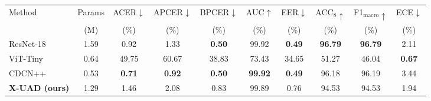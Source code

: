 \begin{tabular}{lccccccccc}
\toprule
Method & Params & ACER$\downarrow$ & APCER$\downarrow$ & BPCER$\downarrow$ & AUC$\uparrow$ & EER$\downarrow$ & ACC$_8\uparrow$ & F1$_{\text{macro}}\uparrow$ & ECE$\downarrow$ \\
 & (M) & (\%) & (\%) & (\%) & (\%) & (\%) & (\%) & (\%) & (\%) \\
\midrule
ResNet-18~\cite{he2016resnet} & 1.59 & 0.92 & 1.33 & \textbf{0.50} & 99.92 & \textbf{0.49} & \textbf{96.79} & \textbf{96.79} & 2.11 \\
ViT-Tiny~\cite{dosovitskiy2021vit} & 0.64 & 49.75 & 60.67 & 38.83 & 73.43 & 34.65 & 51.27 & 46.04 & \textbf{0.67} \\
CDCN++~\cite{yu2020cdcn} & 0.53 & \textbf{0.71} & \textbf{0.92} & \textbf{0.50} & \textbf{99.92} & \textbf{0.49} & 96.18 & 96.19 & 3.44 \\
\textbf{X-UAD (ours)} & 1.29 & 1.46 & 2.08 & 0.83 & 99.89 & 0.76 & 94.53 & 94.53 & 1.94 \\
\bottomrule
\end{tabular}